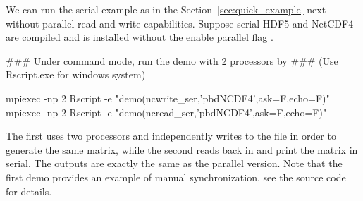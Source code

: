 We can run the serial example as in the
Section~\ref{sec:quick_example} next without parallel read and write
capabilities.
Suppose serial HDF5 and NetCDF4
are compiled and  is installed without the enable parallel flag
\code{-}.
\begin{Command}
### Under command mode, run the demo with 2 processors by
### (Use Rscript.exe for windows system)

mpiexec -np 2 Rscript -e "demo(ncwrite_ser,'pbdNCDF4',ask=F,echo=F)"
mpiexec -np 2 Rscript -e "demo(ncread_ser,'pbdNCDF4',ask=F,echo=F)"
\end{Command}
The first  uses two processors and
independently writes to the file
 in order to generate the same matrix,
while the second  reads back in and print the matrix in
serial. The outputs are exactly the same as the parallel version.
Note that the first demo  provides an example of
manual synchronization, see the source code for details.

